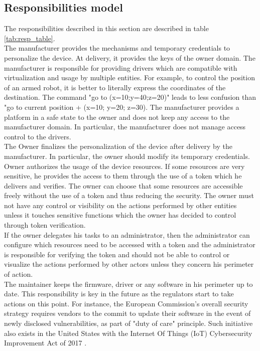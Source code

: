 \documentclass[conference]{IEEEtran}
\begin{document}
\subsection{Responsibilities model}
\label{sec:Resp_model}
The responsibilities described in this section are described in table \ref{tab:resp_table}.\\

The manufacturer provides the mechanisms and temporary credentials to personalize the device. At delivery, it provides the keys of the owner domain. The manufacturer is responsible for providing drivers which are compatible with virtualization and usage by multiple entities. For example, to control the position of an armed robot, it is better to literally express the coordinates of the destination. The command "go to (x=10;y=40;z=20)" leads to less confusion than "go to current position + (x=10; y=20; z=30). The manufacturer provides a platform in a safe state to the owner and does not keep any access to the manufacturer domain. In particular, the manufacturer does not manage access control to the drivers.\\

The Owner finalizes the personalization of the device after delivery by the manufacturer. In particular, the owner should modify its temporary credentials. Owner authorizes the usage of the device resources. If some resources are very sensitive, he provides the access to them through the use of a token which he delivers and verifies. The owner can choose that some resources are accessible freely without the use of a token and thus reducing the security. The owner must not have any control or visibility on the actions performed by other entities unless it touches sensitive functions which the owner has decided to control through token verification.\\

If the owner delegates his tasks to an administrator, then the administrator can configure which resources need to be accessed with a token and the administrator is responsible for verifying the token and should not be able to control or visualize the actions performed by other actors unless they concern his perimeter of action.\\

The maintainer keeps the firmware, driver or any software in his perimeter up to date. This responsibility is key in the future as the regulators start to take actions on this point. For instance, the European Commission's overall security strategy \cite{enisa_iot_2017} requires vendors to the commit to update their software in the event of newly disclosed vulnerabilities, as part of "duty of care" principle. Such initiative also exists in the United States with the Internet Of Things (IoT) Cybersecurity Improvement Act of 2017 \cite{IOTAct_2017}.\\
\end{document}
